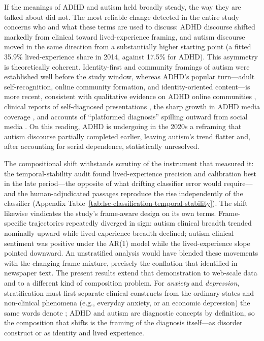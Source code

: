 If the meanings of ADHD and autism held broadly steady, the way they are talked about did not. The most reliable change detected in the entire study concerns who and what these terms are used to discuss: ADHD discourse shifted markedly from clinical toward lived-experience framing, and autism discourse moved in the same direction from a substantially higher starting point (a fitted 35.9\% lived-experience share in 2014, against 17.5\% for ADHD). This asymmetry is theoretically coherent. Identity-first and community framings of autism were established well before the study window, whereas ADHD's popular turn---adult self-recognition, online community formation, and identity-oriented content---is more recent, consistent with qualitative evidence on ADHD online communities \citep{ginappExperiencesAdultsADHD2023}, clinical reports of self-diagnosed presentations \citep{hartnettSocialMediaADHD2024}, the sharp growth in ADHD media coverage \citep{martinChangingPrevalenceADHD2025}, and accounts of ``platformed diagnosis'' spilling outward from social media \citep{alperTikTokAlgorithmicallyMediated2025}. On this reading, ADHD is undergoing in the 2020s a reframing that autism discourse partially completed earlier, leaving autism's trend flatter and, after accounting for serial dependence, statistically unresolved.

The compositional shift withstands scrutiny of the instrument that measured it: the temporal-stability audit found lived-experience precision and calibration best in the late period---the opposite of what drifting classifier error would require---and the human-adjudicated passages reproduce the rise independently of the classifier (Appendix Table~\ref{tab:lsc-classification-temporal-stability}). The shift likewise vindicates the study's frame-aware design on its own terms. Frame-specific trajectories repeatedly diverged in sign: autism clinical breadth trended nominally upward while lived-experience breadth declined; autism clinical sentiment was positive under the AR(1) model while the lived-experience slope pointed downward. An unstratified analysis would have blended these movements with the changing frame mixture, precisely the conflation that \citet{pislRevisitingSemanticSeverity2025} identified in newspaper text. The present results extend that demonstration to web-scale data and to a different kind of composition problem. For \textit{anxiety} and \textit{depression}, stratification must first separate clinical constructs from the ordinary states and non-clinical phenomena (e.g., everyday anxiety, or an economic depression) the same words denote \citep{xiaoHaveConceptsAnxiety2023}; ADHD and autism are diagnostic concepts by definition, so the composition that shifts is the framing of the diagnosis itself---as disorder construct or as identity and lived experience.

